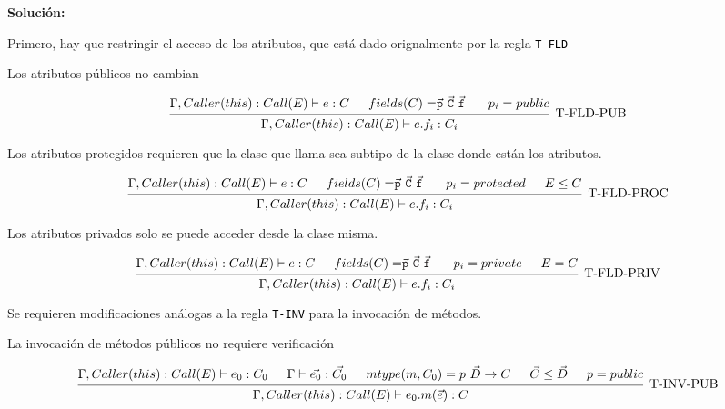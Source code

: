 \documentclass{article}
\newcommand{\tx}[1]{\textcolor{Black} {\texttt{#1}}}
\newcommand{\tb}[1]{\textcolor{RoyalPurple} {\textbf{#1}}}
\newcommand{\tvec}[1]{$\vec{\tx{#1}}$ }
\begin{document}
\begin{enumerate}
        \tb{Solución:}

        Primero, hay que restringir el acceso de los atributos, que está dado 
        orignalmente por la regla \tx{T-FLD}

        Los atributos públicos no cambian

        \[\begin{prooftree}
            \hypo{\Gamma, Caller(this) : Call(E) \vdash e : C}
            \hypo{fields(C) = $\tvec{p}\tvec{C}\tvec{f}$}
            \hypo{p_i = public}
            \infer 3 [T-FLD-PUB] {\Gamma, Caller(this) : Call(E) \vdash e.f_i : C_i}
        \end{prooftree}
        \]

        Los atributos protegidos requieren que la clase que llama sea subtipo de
        la clase donde están los atributos.

        \[
        \begin{prooftree}
            \hypo{\Gamma, Caller(this) : Call(E) \vdash e : C}
            \hypo{fields(C) = $\tvec{p}\tvec{C}\tvec{f}$}
            \hypo{p_i = protected}
            \hypo{E \leq C}
            \infer 4 [T-FLD-PROC] {\Gamma, Caller(this) : Call(E) \vdash e.f_i : C_i}
        \end{prooftree}
        \]

        Los atributos privados solo se puede acceder desde la clase misma.

        \[
        \begin{prooftree}
            \hypo{\Gamma, Caller(this) : Call(E) \vdash e : C}
            \hypo{fields(C) = $\tvec{p}\tvec{C}\tvec{f}$}
            \hypo{p_i = private}
            \hypo{E = C}
            \infer 4 [T-FLD-PRIV] {\Gamma, Caller(this) : Call(E) \vdash e.f_i : C_i}
        \end{prooftree}
        \]

        Se requieren modificaciones análogas a la regla \tx{T-INV} para la 
        invocación de métodos.

        La invocación de métodos públicos no requiere verificación

        \[\begin{prooftree}
            \hypo{\Gamma, Caller(this) : Call(E) \vdash e_0 : C_0}
            \hypo{\Gamma \vdash \vec{e_0} : \vec{C_0}}
            \hypo{mtype(m, C_0) = p \ \vec{D} \rightarrow C}
            \hypo{\vec{C} \leq \vec{D}}
            \hypo{p = public}
            \infer 5 [T-INV-PUB] {\Gamma, Caller(this) : Call(E) \vdash e_0.m(\vec{e}) : C}
        \end{prooftree}\]


\end{enumerate}
\end{document}
